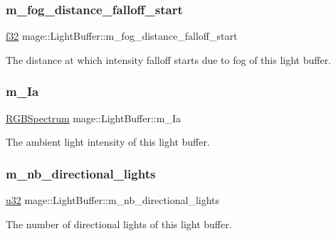 \subsubsection{\texorpdfstring{m\+\_\+fog\+\_\+distance\+\_\+falloff\+\_\+start}{m\_fog\_distance\_falloff\_start}}
{\footnotesize\ttfamily \hyperlink{namespacemage_a6a44ad388483959dc4dff9f2aef91431}{f32} mage\+::\+Light\+Buffer\+::m\+\_\+fog\+\_\+distance\+\_\+falloff\+\_\+start}

The distance at which intensity falloff starts due to fog of this light buffer. \hypertarget{structmage_1_1_light_buffer_a1053a31ecdfdec2d4703376152f6defc}{}\label{structmage_1_1_light_buffer_a1053a31ecdfdec2d4703376152f6defc} 
\subsubsection{\texorpdfstring{m\+\_\+\+Ia}{m\_Ia}}
{\footnotesize\ttfamily \hyperlink{structmage_1_1_r_g_b_spectrum}{R\+G\+B\+Spectrum} mage\+::\+Light\+Buffer\+::m\+\_\+\+Ia}

The ambient light intensity of this light buffer. \hypertarget{structmage_1_1_light_buffer_a829e23ebcbddde6207237d85cf73592c}{}\label{structmage_1_1_light_buffer_a829e23ebcbddde6207237d85cf73592c} 
\subsubsection{\texorpdfstring{m\+\_\+nb\+\_\+directional\+\_\+lights}{m\_nb\_directional\_lights}}
{\footnotesize\ttfamily \hyperlink{namespacemage_af2b398bf98eb10351f49cad73fe2cc73}{u32} mage\+::\+Light\+Buffer\+::m\+\_\+nb\+\_\+directional\+\_\+lights}

The number of directional lights of this light buffer. \hypertarget{structmage_1_1_light_buffer_af035d6a6ce21f6f307972c7d97ed11a2}{}\label{structmage_1_1_light_buffer_af035d6a6ce21f6f307972c7d97ed11a2} 
